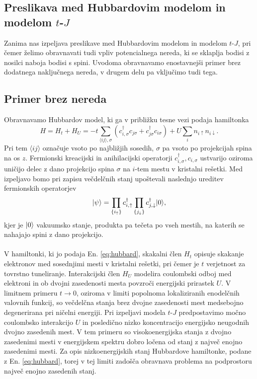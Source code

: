 \cleardoublepage
\renewcommand\appendixname{Dodatek}
\begin{appendices}

\chapter{Preslikava med Hubbardovim modelom in modelom $t$-$J$}
\label{tj_hubb_preslikava}
Zanima nas izpeljava preslikave med Hubbardovim modelom in modelom $t$-$J$, pri čemer želimo obravnavati tudi vpliv potencialnega nereda, ki se sklaplja bodisi z nosilci naboja bodisi s spini. Uvodoma obravnavamo enostavnejši primer brez dodatnega naključnega nereda, v drugem delu pa vključimo tudi tega. 
\section{Primer brez nereda}
Obravnavamo Hubbardov model, ki ga v približku tesne vezi podaja hamiltonka
\begin{equation}\label{eq:hubbard}
H=H_t + H_U=-t\sum\limits_{\langle ij \rangle, \sigma}\left(c^\dagger_{i,\sigma} c_{j\sigma} + c^\dagger_{j\sigma}c_{i\sigma}\right) + U\sum_i n_{i\uparrow}n_{i\downarrow}.
\end{equation}
Pri tem  $\langle ij \rangle$ označuje vsoto po najbližjih sosedih, $\sigma$ pa vsoto po projekcijah spina na os $z$. Fermionski kreacijski in anihilacijski operatorji $c^\dagger_{i,\sigma}, c_{i,\sigma}$ ustvarijo oziroma uničijo delec z dano projekcijo spina $\sigma$ na $i$-tem mestu v kristalni rešetki.  Med izpeljavo bomo pri zapisu večdelčnih stanj upoštevali naslednjo ureditev fermionskih operatorjev
$$
\vert\psi\rangle=\prod\limits_{\{i_\uparrow \}} c_{i, \uparrow}^\dagger \prod\limits_{\{j_\downarrow \}} c_{j, \downarrow}^\dagger \vert0\rangle,
$$
kjer je $\vert0\rangle$ vakuumsko stanje, produkta pa tečeta po vseh mestih, na katerih se nahajajo spini z dano projekcijo. \\\\
V hamiltonki, ki jo podaja En. \eqref{eq:hubbard}, skakalni člen $H_t$ opisuje skakanje elektronov med sosednjimi mesti v kristalni rešetki, pri čemer je $t$ verjetnost za tovrstno tuneliranje. Interakcijski člen $H_U$ modelira coulombski odboj med elektroni in ob dvojni zasedenosti mesta povzroči energijski prirastek $U$. V limitnem primeru $t\to 0$, oziroma v limiti popolnoma lokaliziranih enodelčnih valovnih funkcij, so večdelčna stanja brez dvojne zasedenosti mest medsebojno degenerirana pri ničelni energiji. Pri izpeljavi modela $t$-$J$ predpostavimo močno coulombsko interakcijo $U$ in posledično nizko koncentracijo energijsko neugodnih dvojno zasedenih mest. V tem primeru so visokoenergijska stanja z dvojno zasedenimi mesti v energijskem spektru dobro ločena od stanj z največ enojno zasedenimi mesti. Za opis nizkoenergijskih stanj Hubbardove hamiltonke, podane z En. \eqref{eq:hubbard}, torej v tej limiti zadošča obravnava problema na podprostoru največ enojno zasedenih stanj.  \\

\end{appendices}
